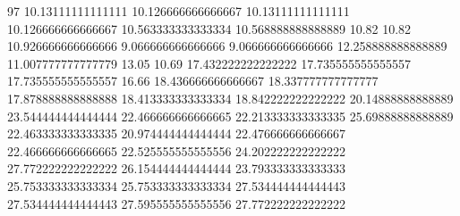97 10.13111111111111 10.126666666666667 10.13111111111111 10.126666666666667 10.563333333333334 10.568888888888889 10.82 10.82 10.926666666666666 9.066666666666666 9.066666666666666 12.258888888888889 11.007777777777779 13.05 10.69 17.432222222222222 17.735555555555557 17.735555555555557 16.66 18.436666666666667 18.337777777777777 17.878888888888888 18.413333333333334 18.842222222222222 20.14888888888889 23.544444444444444 22.466666666666665 22.213333333333335 25.69888888888889 22.463333333333335 20.974444444444444 22.476666666666667 22.466666666666665 22.525555555555556 24.202222222222222 27.772222222222222 26.154444444444444 23.793333333333333 25.753333333333334 25.753333333333334 27.534444444444443 27.534444444444443 27.595555555555556 27.772222222222222
